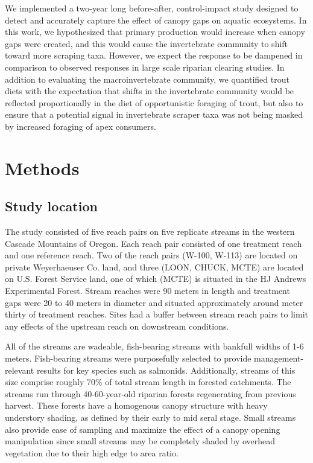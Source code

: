 \documentclass[double,12pt]{beavtex}
\begin{document}
  We implemented a two-year long before-after, control-impact study
  designed to detect and accurately capture the effect of canopy gaps on
  aquatic ecosystems. In this work, we hypothesized that primary
  production would increase when canopy gaps were created, and this would
  cause the invertebrate community to shift toward more scraping taxa.
  However, we expect the response to be dampened in comparison to observed
  responses in large scale riparian clearing studies. In addition to
  evaluating the macroinvertebrate community, we quantified trout diets
  with the expectation that shifts in the invertebrate community would be
  reflected proportionally in the diet of opportunistic foraging of trout,
  but also to ensure that a potential signal in invertebrate scraper taxa
  was not being masked by increased foraging of apex consumers.
  
  \chapter*{Methods}\label{methods}
  
  \section*{Study location}\label{study-location}
  
  The study consisted of five reach pairs on five replicate streams in the
  western Cascade Mountains of Oregon. Each reach pair consisted of one
  treatment reach and one reference reach. Two of the reach pairs (W-100,
  W-113) are located on private Weyerhaeuser Co. land, and three (LOON,
  CHUCK, MCTE) are located on U.S. Forest Service land, one of which
  (MCTE) is situated in the HJ Andrews Experimental Forest. Stream reaches
  were 90 meters in length and treatment gaps were 20 to 40 meters in
  diameter and situated approximately around meter thirty of treatment
  reaches. Sites had a buffer between stream reach pairs to limit any
  effects of the upstream reach on downstream conditions.
  
  All of the streams are wadeable, fish-bearing streams with bankfull
  widths of 1-6 meters. Fish-bearing streams were purposefully selected to
  provide management-relevant results for key species such as salmonids.
  Additionally, streams of this size comprise roughly 70\% of total stream
  length in forested catchments. The streams run through 40-60-year-old
  riparian forests regenerating from previous harvest. These forests have
  a homogenous canopy structure with heavy understory shading, as defined
  by their early to mid seral stage. Small streams also provide ease of
  sampling and maximize the effect of a canopy opening manipulation since
  small streams may be completely shaded by overhead vegetation due to
  their high edge to area ratio.
  
\end{document}
